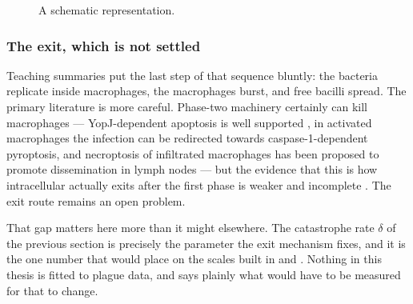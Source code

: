 \begin{figure}[h!]
\caption*{Neutrophils phagocytose and eliminate the remaining phase one bacteria, leaving \yp{} as a primarily extracellular infection.}
    \caption{A schematic representation.}
    \label{fig:two_columns_six_image}
\end{figure}

\subsubsection*{The exit, which is not settled}

Teaching summaries put the last step of that sequence bluntly: the bacteria
replicate inside macrophages, the macrophages burst, and free bacilli spread.
The primary literature is more careful. Phase-two machinery certainly can kill
macrophages --- YopJ-dependent apoptosis is well supported
\cite{MonackEtAl1997}, in activated macrophages the infection can be redirected
towards caspase-1-dependent pyroptosis, and necroptosis of infiltrated
macrophages has been proposed to promote dissemination in lymph nodes
\cite{PetersEtAl2013} --- but the evidence that this is how intracellular \yp{}
actually exits after the first phase is weaker and incomplete
\cite{ZaubermanEtAl2006}. The exit route remains an open problem.

That gap matters here more than it might elsewhere. The catastrophe rate
$\delta$ of the previous section is precisely the parameter the exit mechanism
fixes, and it is the one number that would place \yp{} on the scales built in
 and
. Nothing in this thesis is fitted to plague
data, and  says plainly what would have to
be measured for that to change.
